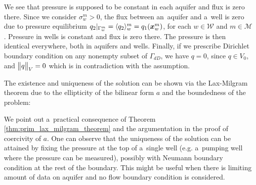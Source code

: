 We see that pressure is supposed to be constant in each aquifer and flux is zero there.
Since we consider $\sigma^m_w>0$, the flux between an~aquifer and a~well is zero due to pressure equilibrium
$q_2|_{\Gamma^m_w} = \langle q_2\rangle^m_w = q_1(\mathbf{\boldsymbol{x}}^m_w)$, for each $w\in\mathcal W$ and $m\in\mathcal M$.
Pressure in wells is constant and flux is zero there. The pressure is then identical everywhere, both in aquifers and wells.
Finally, if we prescribe Dirichlet boundary condition on any nonempty subset of $\Gamma_{dD}$, we have $q=0$, since $q\in V_0$,
and $\bigl\Vert q\bigr\Vert_V=0$ which is in contradiction with the assumption.

The existence and uniqueness of the solution can be shown via the Lax-Milgram theorem due to the ellipticity
of the bilinear form $a$ and the boundedness of the problem:

%
We point out a~practical consequence of Theorem \ref{thm:prim_lax_milgram_theorem} and the argumentation in the proof of coercivity of $a$.
One can observe that the uniqueness of the solution can be attained by fixing the pressure at the top of a~single well
(e.g. a~pumping well where the pressure can be measured), possibly with Neumann boundary condition at the rest of the boundary.
This might be useful when there is limiting amount of data on aquifer and no flow boundary condition is considered.

